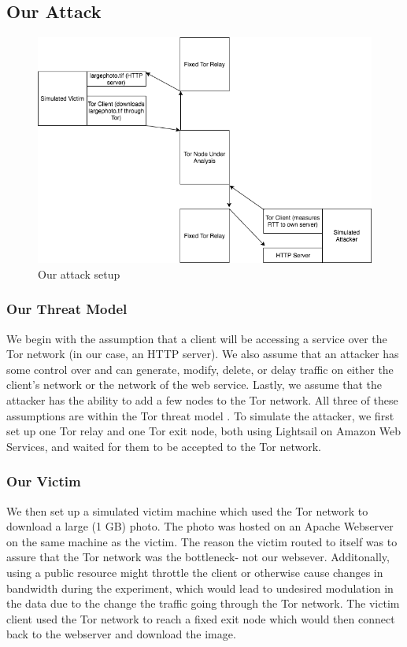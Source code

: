 \documentclass[12pt,journal]{IEEEtran}
\begin{document}
\subsection{Our Attack}
\begin{figure}
 \center
  \includegraphics[width=\textwidth]{figures/oursetup.png}
  \caption{Our attack setup}
  \label{oursetup}
\end{figure}
\subsubsection{Our Threat Model}
We begin with the assumption that a client will be accessing a service over the Tor network (in our case, an HTTP server). We also assume that an attacker has some control over and can generate, modify, delete, or delay traffic on either the client's network or the network of the web service. Lastly, we assume that the attacker has the ability to add a few nodes to the Tor network. All three of these assumptions are within the Tor threat model \cite{Dingledine:2004:TSO:1251375.1251396}.
To simulate the attacker, we first set up one Tor relay and one Tor exit node, both using Lightsail on Amazon Web Services, and waited for them to be accepted to the Tor network.


\subsubsection{Our Victim}We then set up a simulated victim machine which used the Tor network to download a large (1 GB) photo. The photo was hosted on an Apache Webserver on the same machine as the victim. The reason the victim routed to itself was to assure that the Tor network was the bottleneck- not our websever. Additonally, using a public resource might throttle the client or otherwise cause changes in bandwidth during the experiment, which would lead to undesired modulation in the data due to the change the traffic going through the Tor network. The victim client used the Tor network to reach a fixed exit node which would then connect back to the webserver and download the image.
\end{document}
